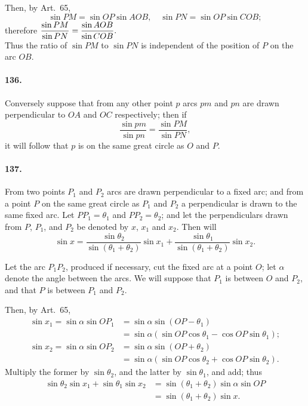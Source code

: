 \documentclass{book}[2004/02/16]
\begin{document}
\begin{mainmatter}
\begin{spacing}{1.3}
Then, by Art.\ 65,
\[
\sin PM = \sin OP \sin AOB,\quad \sin PN = \sin OP \sin COB;
\]
therefore
$\hfill\displaystyle
\frac{\sin PM}{\sin PN} = \frac{\sin AOB}{\sin COB}.
\hfill\phantom{therefore}$\\

Thus the ratio of $\sin PM$ to $\sin PN$ is independent of the position
of $P$ on the arc $OB$.

\paragraph{136.} Conversely suppose that from any other point $p$ arcs $pm$
and $pn$ are drawn perpendicular to $OA$ and $OC$ respectively; then if
\[
\frac{\sin pm}{\sin pn} = \frac{\sin PM}{\sin PN},
\]
it will follow that $p$ is on the same great circle as $O$ and $P$.

\paragraph{137.} From two points $P_1$ and $P_2$ arcs are drawn perpendicular
to a fixed arc; and from a point $P$ on the same great circle
as $P_1$ and $P_2$ a perpendicular is drawn to the same fixed arc. Let
$PP_1 = \theta_1$ and $PP_2 = \theta_2$; and let the perpendiculars drawn from $P$,
$P_1$, and $P_2$ be denoted by $x$, $x_1$ and $x_2$. Then will
\[
\sin x
= \frac{\sin \theta_2}{\sin(\theta_1 + \theta_2)} \sin x_1
+ \frac{\sin \theta_1}{\sin(\theta_1 + \theta_2)} \sin x_2.
\]

Let the arc $P_1 P_2$, produced if necessary, cut the fixed arc at a
point $O$; let $\alpha$ denote the angle between the arcs. We will suppose
that $P_1$ is between $O$ and $P_2$, and that $P$ is between $P_1$ and $P_2$.

Then, by Art.~65,
\begin{align*}
\sin x_1 = \sin \alpha \sin OP_1 &= \sin \alpha \sin (OP - \theta_1) \\
    &= \sin \alpha (\sin OP \cos \theta_1 - \cos OP \sin \theta_1);\\
\sin x_2 = \sin \alpha \sin OP_2 &= \sin \alpha \sin (OP + \theta_2) \\
    &= \sin \alpha (\sin OP \cos \theta_2 + \cos OP \sin \theta_2).
\end{align*}
Multiply the former by $\sin\theta_2$, and the latter by $\sin\theta_1$, and add;
thus
\begin{align*}
\sin \theta_2 \sin x_1 + \sin \theta_1 \sin x_2 &= \sin (\theta_1 + \theta_2) \sin \alpha \sin OP\\
     &= \sin (\theta_1 + \theta_2) \sin x.
\end{align*}


\end{spacing}
\end{mainmatter}
\end{document}
